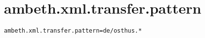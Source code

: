 \section{ambeth.xml.transfer.pattern}
\label{configuration:AmbethXmlTransferPattern}
\ClearAPI
\TODO
{}
\begin{lstlisting}[style=Props,caption={Usage example for \textit{ambeth.xml.transfer.pattern}}]
ambeth.xml.transfer.pattern=de/osthus.*
\end{lstlisting}